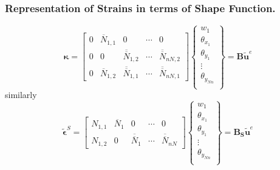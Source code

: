 \documentclass[9pt]{beamer}
\begin{document}
\begin{frame}
\frametitle{Representation of Strains in terms of Shape Function.}

\begin{equation*}
\mathbf{ \kappa } = 
\begin{bmatrix}
0 & \overline{N}_{1,1} & 0 & \cdots & 0 \\
0&  0 & \overline{\overline{N}}_{1,2}  & \cdots & \overline{\overline{N}}_{nN,2} 
\\
0&  \overline{N}_{1,2} & \overline{\overline{N}}_{1,1}  & \cdots & \overline{\overline{N}}_{nN,1} 
\end{bmatrix} 
\left\{
\begin{array}{r}
w_1 \\
\theta_{x_1} \\
\theta_{y_1} \\
\vdots \\
\theta_{y_{Nn}} \\
\end{array} \right\}=\mathbf{ B } \tilde{\mathbf{u}}^e
\end{equation*}
similarly
\begin{equation}
\tilde{\mathbf{\epsilon}}^S = 
\begin{bmatrix}
N_{1,1} & \overline{N}_{1} & 0 & \cdots & 0 
\\
N_{1,2} & 0 & \overline{\overline{N}}_{1} & \cdots & \overline{\overline{N}}_{nN} 
\end{bmatrix} 
\left\{
\begin{array}{r}
w_1 \\
\theta_{x_1} \\
\theta_{y_1} \\
\vdots \\
\theta_{y_{Nn}} \\
\end{array} \right\}=\mathbf{ B_S }\tilde{\mathbf{u}}^e
\end{equation}
\end{frame}
\end{document}
